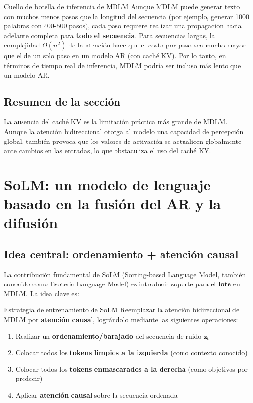 \documentclass[a4paper]{article}
\begin{document}
\begin{warningbox}{Cuello de botella de inferencia de MDLM}
Aunque MDLM puede generar texto con muchos menos pasos que la longitud del secuencia (por ejemplo, generar 1000 palabras con 400-500 pasos), cada paso requiere realizar una propagación hacia adelante completa para \textbf{todo el secuencia}. Para secuencias largas, la complejidad $O(n^2)$ de la atención hace que el costo por paso sea mucho mayor que el de un solo paso en un modelo AR (con caché KV). Por lo tanto, en términos de tiempo real de inferencia, MDLM podría ser incluso más lento que un modelo AR.
\end{warningbox}

\subsection{Resumen de la sección}

La ausencia del caché KV es la limitación práctica más grande de MDLM. Aunque la atención bidireccional otorga al modelo una capacidad de percepción global, también provoca que los valores de activación se actualicen globalmente ante cambios en las entradas, lo que obstaculiza el uso del caché KV.

\newpage
\section{SoLM: un modelo de lenguaje basado en la fusión del AR y la difusión}

\subsection{Idea central: ordenamiento + atención causal}

La contribución fundamental de SoLM (Sorting-based Language Model, también conocido como Esoteric Language Model) es introducir soporte para el \textbf{lote} en MDLM. La idea clave es:

\begin{importantbox}{Estrategia de entrenamiento de SoLM}
Reemplazar la atención bidireccional de MDLM por \textbf{atención causal}, lográndolo mediante las siguientes operaciones:
\begin{enumerate}
    \item Realizar un \textbf{ordenamiento/barajado} del secuencia de ruido $\mathbf{z}_t$
    \item Colocar todos los \textbf{tokens limpios a la izquierda} (como contexto conocido)
    \item Colocar todos los \textbf{tokens enmascarados a la derecha} (como objetivos por predecir)
    \item Aplicar \textbf{atención causal} sobre la secuencia ordenada
\end{enumerate}
\end{importantbox}
\end{document}
